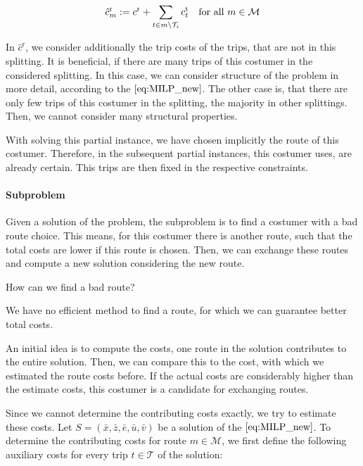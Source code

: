 \begin{align}
	\hat{c}^{\operatorname{r}}_m := c^{\operatorname{r}} + \sum_{t\in m\backslash\mathcal{T}_i}c^{\operatorname{t}}_t & & \text{for all } m\in\mathcal{M}
\end{align}

In $\hat{c}^{\operatorname{r}}$, we consider additionally the trip costs of the trips, that are not in this splitting. It is beneficial, if there are many trips of this costumer in the considered splitting. In this case, we can consider structure of the problem in more detail, according to the $\eqref{eq:MILP_new}$. The other case is, that there are only few trips of this costumer in the splitting, the majority in other splittings. Then, we cannot consider many structural properties. 

With solving this partial instance, we have chosen implicitly the route of this costumer. Therefore, in the subsequent partial instances, this costumer uses, are already certain. This trips are then fixed in the respective constraints.

\paragraph{Subproblem} \parfill

Given a solution of the problem, the subproblem is to find a costumer with a bad route choice. This means, for this costumer there is another route, such that the total costs are lower if this route is chosen. Then, we can exchange these routes and compute a new solution considering the new route. 

\begin{question}
	How can we find a bad route?
	
	We have no efficient method to find a route, for which we can guarantee better total costs.
\end{question}

An initial idea is to compute the costs, one route in the solution contributes to the entire solution. Then, we can compare this to the cost, with which we estimated the route costs before. If the actual costs are considerably higher than the estimate costs, this costumer is a candidate for exchanging routes.

Since we cannot determine the contributing costs exactly, we try to estimate these costs. Let $S=\left(\bar{x},\bar{z},\bar{e},\bar{u},\bar{v}\right)$ be a solution of the $\eqref{eq:MILP_new}$. To determine the contributing costs for route $m\in\mathcal{M}$, we first define the following auxiliary costs for every trip $t\in\mathcal{T}$ of the solution:

